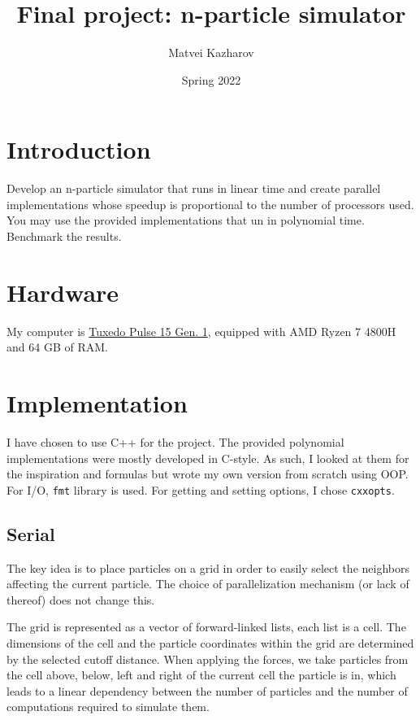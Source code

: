 \documentclass[a4paper,11pt]{article}
\title{
    \textbf{Final project: n-particle simulator}
}
\author{Matvei Kazharov}
\date{Spring 2022}
\begin{document}
\maketitle

\section{Introduction}

\begin{quotationbox}{}
    Develop an n-particle simulator that runs in linear time and create
    parallel implementations whose speedup is proportional to the number of
    processors used. You may use the provided implementations that un in polynomial time.
    Benchmark the results.
\end{quotationbox}

\section{Hardware}
My computer is \href{https://www.tuxedocomputers.com/en/Linux-Hardware/Linux-Notebooks/15-16-inch/TUXEDO-Book-Pulse-15-Gen1.tuxedo}{Tuxedo Pulse 15 Gen. 1},
equipped with AMD Ryzen 7 4800H and 64 GB of RAM.
\section{Implementation}
I have chosen to use C++ for the project. The provided polynomial
implementations were mostly developed in C-style. As such, I looked at them for
the inspiration and formulas but wrote my own version from scratch using OOP.
For I/O, \texttt{fmt} library is used. For getting and setting options, I chose \texttt{cxxopts}.

\subsection{Serial}
The key idea is to place particles on a grid in order to easily select the
neighbors affecting the current particle. The choice of parallelization
mechanism (or lack of thereof) does not change this.

The grid is represented as a vector of forward-linked lists, each list is a cell.
The dimensions of the cell and the particle coordinates within the grid are determined by
the selected cutoff distance. When applying the forces, we take particles from
the cell above, below, left and right of the current cell the particle is in, which
leads to a linear dependency between the number of particles and the number of
computations required to simulate them.
\end{document}
